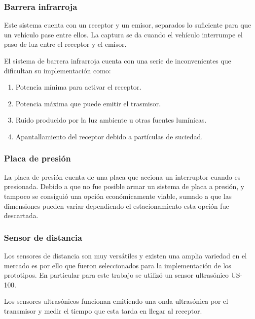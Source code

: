 \subsubsection*{Barrera infrarroja}

Este sistema cuenta con un receptor y un emisor, separados lo suficiente para que un vehículo pase entre ellos. La captura se da cuando el vehículo interrumpe el paso de luz entre el receptor y el emisor.

El sistema de barrera infrarroja cuenta con una serie de inconvenientes que dificultan su implementación como:

\begin{enumerate}
    \item Potencia mínima para activar el receptor.
    \item Potencia máxima que puede emitir el trasmisor.
    \item Ruido producido por la luz ambiente u otras fuentes lumínicas.
    \item Apantallamiento del receptor debido a partículas de suciedad.
\end{enumerate}

\subsubsection*{Placa de presión}

La placa de presión cuenta de una placa que acciona un interruptor cuando es presionada. Debido a que no fue posible armar un sistema de placa a presión, y tampoco se consiguió una opción económicamente viable, sumado a que las dimensiones pueden variar dependiendo el estacionamiento esta opción fue descartada.

\subsubsection*{Sensor de distancia}

Los sensores de distancia son muy versátiles y existen una amplia variedad en el mercado es por ello que fueron seleccionados para la implementación de los prototipos.
En particular para este trabajo se utilizó un sensor ultrasónico US-100.

Los sensores ultrasónicos funcionan emitiendo una onda ultrasónica por el transmisor y medir el tiempo que esta tarda en llegar al receptor.

